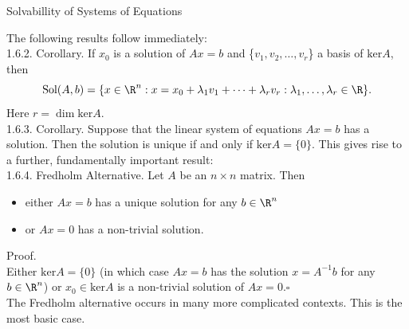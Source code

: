 \documentclass[smaller,hyperref={CJKbookmarks=true}]{beamer}
\newcommand{\myseries}[2]{$#1_1,#1_2,\dots,#1_#2$}
\begin{document}
\begin{frame}{Solvabillity of Systems of Equations}
\begin{spacing}{1.1}
The following results follow immediately:\\[7pt]
\alert{1.6.2. Corollary.} If $x_0$ is a solution of $Ax=b$ and \{\myseries{v}{r}\} a basis of $\text{ker}A$, then
\[\text{Sol}(A,b)=\{x\in\R^n:x=x_0+\lambda_1v_1+\cdots+\lambda_rv_r:\lambda_1,\ldots,\lambda_r\in\R\}.\]
Here $r=\dim\text{ker}A$.\\[8pt]
\alert{1.6.3. Corollary.} Suppose that the linear system of equations $Ax=b$ has a solution. Then the solution is unique if and only if $\text{ker}A=\{0\}$.
\newpage
This gives rise to a further, fundamentally important result:\\[7pt]
\alert{1.6.4. Fredholm Alternative.} Let $A$ be an $n\times n$ matrix. Then
\begin{itemize}
  \item \alert{either} $Ax=b$ has a unique solution for any $b\in\R^n$
  \item \alert{or} $Ax=0$ has a non-trivial solution.
\end{itemize}
\vspace*{10pt}
\alert{Proof.}\\
Either $\text{ker}A=\{0\}$ (in which case $Ax=b$ has the solution $x=A^{-1}b$ for any $b\in\R^n$) or $x_0\in\text{ker}A$ is a non-trivial solution of $Ax=0$.$\square$ \\[8pt]
The Fredholm alternative occurs in many more complicated contexts. This
is the most basic case.
\end{spacing}
\end{frame}
\end{document}
